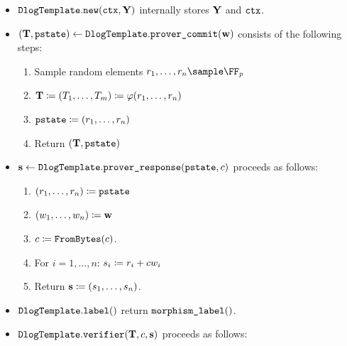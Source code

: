 \documentclass[11pt]{article}
\begin{document}
\begin{itemize}
  \item $\texttt{DlogTemplate}.\texttt{new}(\texttt{ctx}, \mathbf{Y})$ internally stores $\mathbf{Y}$ and $\texttt{ctx}$.
  \item\label{item:basic:p1}
   $(\mathbf {T}, \texttt{pstate}) \gets \texttt{DlogTemplate}.\texttt{prover\_commit}(\mathbf {w})$ consists of the following steps:
    \begin{enumerate}
      \item\label{item:basic:p1:randomness}
        Sample random elements $\randomness_1,\dots,\randomness_n\sample\FF_p$
      \item
         $\mathbf {T} \coloneqq (T_1,\dots,T_m)\coloneqq\varphi(r_1,\dots,r_n)$
      \item $\texttt{pstate}\coloneqq (r_1,\dots,r_n)$
      \item
        Return $(\mathbf {T},\texttt{pstate})$
    \end{enumerate}
  \item\label{item:basic:p2}
    $\mathbf {s} \gets \texttt{DlogTemplate}.\texttt{prover\_response}(\texttt{pstate},c)$ proceeds as follows:
    \begin{enumerate}
      \item  $(r_1,\dots,r_n)\coloneqq \texttt{pstate}$
      \item  $(w_1,\dots,w_n)\coloneqq \mathbf {w}$
      \item
        $c \coloneqq \texttt{FromBytes}(c)$.
      \item For $i=1,\dots,n$: $s_i\coloneqq r_i+c w_i$
			\item Return $\mathbf{s} \coloneqq (s_1,\dots,s_n)$.
    \end{enumerate}
  \item $\texttt{DlogTemplate}.\texttt{label}()$ return $\texttt{morphism\_label}()$.
  \item\label{item:basic:v}
     $\texttt{DlogTemplate}.\texttt{verifier}(\mathbf {T},c,\mathbf {s})$ proceeds as follows:
    \begin{enumerate}

\end{enumerate}
\end{itemize}
\end{document}
